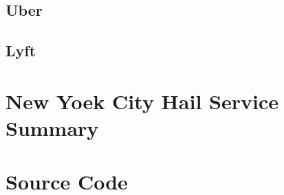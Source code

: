 \documentclass[12pt,twoside]{reedthesis}
\theoremstyle{definition}
\theoremstyle{definition}
\theoremstyle{definition}
\theoremstyle{remark}
\begin{document}
\subsection{Uber}\label{uber-6}

\subsection{Lyft}\label{lyft-6}

\section{New Yoek City Hail Service
Summary}\label{new-yoek-city-hail-service-summary}

\section{Source Code}\label{source-code}
\end{document}
